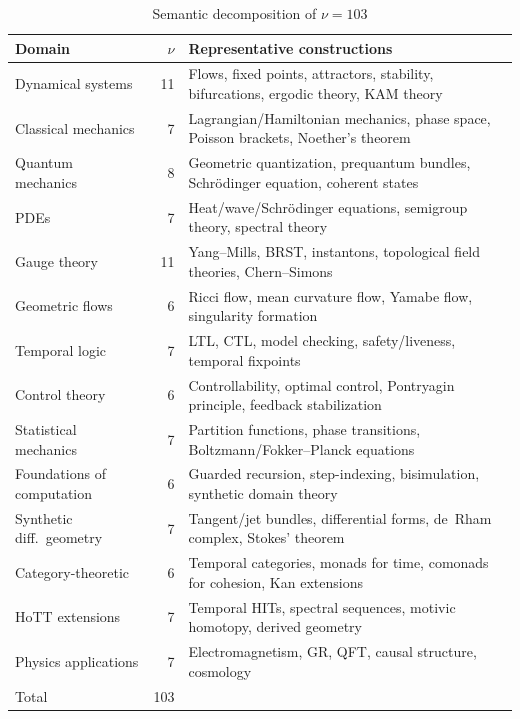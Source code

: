 \documentclass[11pt,a4paper]{article}
\theoremstyle{plain}
\theoremstyle{definition}
\theoremstyle{remark}
\begin{document}
\begin{table}[H]
\centering
\caption{Semantic decomposition of $\nu = 103$}
\label{tab:nu-audit}
\small
\begin{tabular}{@{}lr p{7.5cm}@{}}
\toprule
Domain & $\nu$ & Representative constructions \\
\midrule
Dynamical systems       & 11 & Flows, fixed points, attractors, stability, bifurcations, ergodic theory, KAM theory \\
Classical mechanics     & 7 & Lagrangian/Hamiltonian mechanics, phase space, Poisson brackets, Noether's theorem \\
Quantum mechanics       & 8 & Geometric quantization, prequantum bundles, Schr\"odinger equation, coherent states \\
PDEs                    & 7 & Heat/wave/Schr\"odinger equations, semigroup theory, spectral theory \\
Gauge theory            & 11 & Yang--Mills, BRST, instantons, topological field theories, Chern--Simons \\
Geometric flows         & 6  & Ricci flow, mean curvature flow, Yamabe flow, singularity formation \\
Temporal logic          & 7 & LTL, CTL, model checking, safety/liveness, temporal fixpoints \\
Control theory          & 6  & Controllability, optimal control, Pontryagin principle, feedback stabilization \\
Statistical mechanics   & 7 & Partition functions, phase transitions, Boltzmann/Fokker--Planck equations \\
Foundations of computation & 6 & Guarded recursion, step-indexing, bisimulation, synthetic domain theory \\
Synthetic diff.\ geometry & 7 & Tangent/jet bundles, differential forms, de~Rham complex, Stokes' theorem \\
Category-theoretic      & 6  & Temporal categories, monads for time, comonads for cohesion, Kan extensions \\
HoTT extensions         & 7 & Temporal HITs, spectral sequences, motivic homotopy, derived geometry \\
Physics applications    & 7 & Electromagnetism, GR, QFT, causal structure, cosmology \\
\midrule
Total                   & 103 & \\
\bottomrule
\end{tabular}
\end{table}
\end{document}

